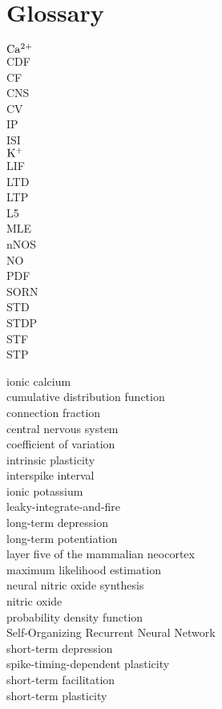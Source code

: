 \documentclass[10pt,a4paper]{article}
\begin{document}
\setcounter{page}{4}

\tableofcontents

\clearpage


\section*{Glossary}
\bigskip
\begin{minipage}{0.33\textwidth} 
$\rm Ca^{2+}$\\
CDF\\
CF\\
CNS\\
CV\\
IP\\
ISI\\
$\rm K^{+}$\\
LIF\\
LTD\\
LTP\\
L5\\
MLE\\
nNOS\\
NO\\
PDF\\
SORN\\
STD\\
STDP\\
STF\\
STP
\end{minipage}
\hfill
\begin{minipage}{0.66\textwidth}
ionic calcium\\
cumulative distribution function\\
connection fraction\\
central nervous system\\
coefficient of variation\\
intrinsic plasticity\\
interspike interval\\
ionic potassium\\
leaky-integrate-and-fire\\
long-term depression\\
long-term potentiation\\
layer five of the mammalian neocortex\\
maximum likelihood estimation\\
neural nitric oxide synthesis\\
nitric oxide\\
probability density function\\
Self-Organizing Recurrent Neural Network\\
short-term depression\\
spike-timing-dependent plasticity\\
short-term facilitation\\
short-term plasticity
\end{minipage}
\end{document}
